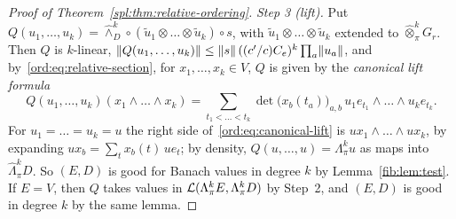 \begin{proof}[Proof of Theorem~\ref{spl:thm:relative-ordering}]
\emph{Step 3 (lift).} Put $Q(u_1,\dots,u_k)=\widehat\wedge^k_D\circ(\tilde u_1\otimes\dots\otimes\tilde u_k)\circ s$, with
$\tilde u_1\otimes\dots\otimes\tilde u_k$ extended to $\widehat\otimes^k_\pi G_r$. Then $Q$ is $k$\nobreakdash-linear,
$\lVert Q(u_1,\dots,u_k)\rVert\le\lVert s\rVert\,((c'/c)C_e)^k\prod_a\lVert u_a\rVert$, and by~\eqref{ord:eq:relative-section}, for
$x_1,\dots,x_k\in V$, $Q$ is given by the \emph{canonical lift formula}
\begin{equation}\label{ord:eq:canonical-lift}
 Q(u_1,\dots,u_k)(x_1\wedge\dots\wedge x_k)=\sum_{t_1<\dots<t_k}\det\bigl(x_b(t_a)\bigr)_{a,b}\,
 u_1e_{t_1}\wedge\dots\wedge u_ke_{t_k}.
\end{equation}
For $u_1=\dots=u_k=u$ the right side of~\eqref{ord:eq:canonical-lift} is $ux_1\wedge\dots\wedge ux_k$, by expanding
$ux_b=\sum_tx_b(t)\,ue_t$; by density, $Q(u,\dots,u)=\Lambda^k_\pi u$ as maps into $\widehat\Lambda^k_\pi D$. So
$(E,D)$ is good for Banach values in degree $k$ by Lemma~\ref{fib:lem:test}. If $E=V$, then $Q$ takes values in
$\mathcal L(\Lambda^k_\pi E,\Lambda^k_\pi D)$ by Step~2, and $(E,D)$ is good in degree $k$ by the same lemma.
\end{proof}
